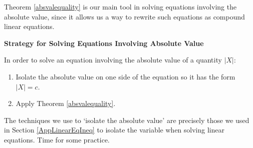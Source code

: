 \documentclass{ximera}
\begin{document}
\medskip

Theorem \ref{absvalequality} is our main tool in solving equations involving the absolute value, since it allows us a way to rewrite such equations as compound linear equations.

\medskip

\label{strategyforsolvingabseqns}

\colorbox{ResultColor}{\bbm

\centerline{\textbf{Strategy for Solving Equations Involving Absolute Value}}

\vspace{0.05in}

In order to solve an equation involving the absolute value of a quantity $|X|$:

\begin{enumerate}

\item  Isolate the absolute value on one side of the equation so it has the form $|X| = c$.

\item  Apply Theorem \ref{absvalequality}.

\end{enumerate}

\ebm}

\smallskip

The techniques we use to `isolate the absolute value' are precisely those we used in Section \ref{AppLinearEqIneq} to isolate the variable when solving linear equations.  Time for some practice.

\enlargethispage{.5in}
\end{document}
